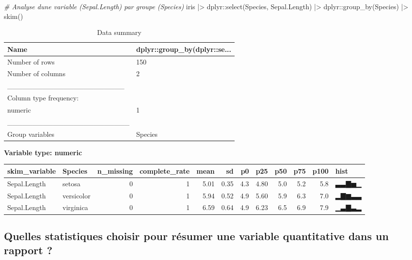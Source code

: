 \documentclass[
]{book}
\newenvironment{Shaded}{\begin{snugshade}}{\end{snugshade}}
\newcommand{\CommentTok}[1]{\textcolor[rgb]{0.56,0.35,0.01}{\textit{#1}}}
\newcommand{\FunctionTok}[1]{\textcolor[rgb]{0.00,0.00,0.00}{#1}}
\newcommand{\NormalTok}[1]{#1}
\newcommand{\SpecialCharTok}[1]{\textcolor[rgb]{0.00,0.00,0.00}{#1}}
\begin{document}
\begin{Shaded}
\begin{Highlighting}[]
\CommentTok{\# Analyse d\textquotesingle{}une variable (Sepal.Length) par groupe (Species)}
\NormalTok{iris }\SpecialCharTok{|\textgreater{}}
\NormalTok{  dplyr}\SpecialCharTok{::}\FunctionTok{select}\NormalTok{(Species, Sepal.Length) }\SpecialCharTok{|\textgreater{}} 
\NormalTok{  dplyr}\SpecialCharTok{::}\FunctionTok{group\_by}\NormalTok{(Species) }\SpecialCharTok{|\textgreater{}}
  \FunctionTok{skim}\NormalTok{()}
\end{Highlighting}
\end{Shaded}

\begin{table}

\caption{\label{tab:unnamed-chunk-6}Data summary}
\centering
\begin{tabular}[t]{l|l}
\hline
Name & dplyr::group\_by(dplyr::se...\\
\hline
Number of rows & 150\\
\hline
Number of columns & 2\\
\hline
\_\_\_\_\_\_\_\_\_\_\_\_\_\_\_\_\_\_\_\_\_\_\_ & \\
\hline
Column type frequency: & \\
\hline
numeric & 1\\
\hline
\_\_\_\_\_\_\_\_\_\_\_\_\_\_\_\_\_\_\_\_\_\_\_\_ & \\
\hline
Group variables & Species\\
\hline
\end{tabular}
\end{table}

\textbf{Variable type: numeric}

\begin{tabular}{l|l|r|r|r|r|r|r|r|r|r|l}
\hline
skim\_variable & Species & n\_missing & complete\_rate & mean & sd & p0 & p25 & p50 & p75 & p100 & hist\\
\hline
Sepal.Length & setosa & 0 & 1 & 5.01 & 0.35 & 4.3 & 4.80 & 5.0 & 5.2 & 5.8 & ▃▃▇▅▁\\
\hline
Sepal.Length & versicolor & 0 & 1 & 5.94 & 0.52 & 4.9 & 5.60 & 5.9 & 6.3 & 7.0 & ▂▇▆▃▃\\
\hline
Sepal.Length & virginica & 0 & 1 & 6.59 & 0.64 & 4.9 & 6.23 & 6.5 & 6.9 & 7.9 & ▁▃▇▃▂\\
\hline
\end{tabular}

\hypertarget{quelles-statistiques-choisir-pour-ruxe9sumer-une-variable-quantitative-dans-un-rapport}{%
\subsection{Quelles statistiques choisir pour résumer une variable quantitative dans un rapport ?}\label{quelles-statistiques-choisir-pour-ruxe9sumer-une-variable-quantitative-dans-un-rapport}}
\end{document}
